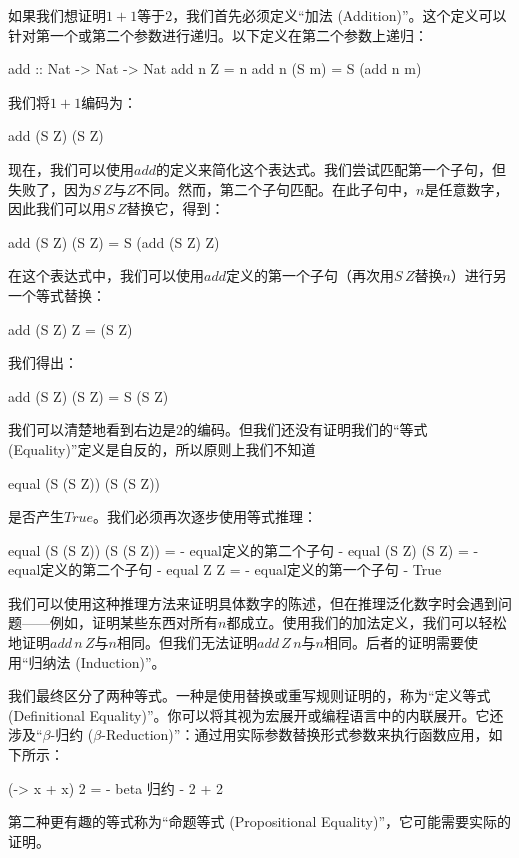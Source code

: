\documentclass[DaoFP]{subfiles}
\begin{document}
 如果我们想证明$1+1$等于$2$，我们首先必须定义“加法 (Addition)”。这个定义可以针对第一个或第二个参数进行递归。以下定义在第二个参数上递归：
 \begin{haskell}
  add :: Nat -> Nat -> Nat
  add n Z = n
  add n (S m) = S (add n m)
 \end{haskell}
 我们将$1 + 1$编码为：
 \begin{haskell}
  add (S Z) (S Z)
 \end{haskell}
 现在，我们可以使用$add$的定义来简化这个表达式。我们尝试匹配第一个子句，但失败了，因为$S\,Z$与$Z$不同。然而，第二个子句匹配。在此子句中，$n$是任意数字，因此我们可以用$S\,Z$替换它，得到：
 \begin{haskell}
  add (S Z) (S Z) = S (add (S Z) Z)
 \end{haskell}
 在这个表达式中，我们可以使用$add$定义的第一个子句（再次用$S\,Z$替换$n$）进行另一个等式替换：
 \begin{haskell}
  add (S Z) Z = (S Z)
 \end{haskell}
 我们得出：
 \begin{haskell}
  add (S Z) (S Z) = S (S Z)
 \end{haskell}
 我们可以清楚地看到右边是$2$的编码。但我们还没有证明我们的“等式 (Equality)”定义是自反的，所以原则上我们不知道
 \begin{haskell}
  equal (S (S Z)) (S (S Z))
 \end{haskell}
 是否产生$True$。我们必须再次逐步使用等式推理：
 \begin{haskell}
  equal (S (S Z)) (S (S Z)) =
   {- equal定义的第二个子句 -}
  equal (S Z) (S Z) =
   {- equal定义的第二个子句 -}
  equal Z Z =
   {- equal定义的第一个子句 -}
  True
 \end{haskell}

 我们可以使用这种推理方法来证明具体数字的陈述，但在推理泛化数字时会遇到问题——例如，证明某些东西对所有$n$都成立。使用我们的加法定义，我们可以轻松地证明$add\,n\,Z$与$n$相同。但我们无法证明$add\,Z\,n$与$n$相同。后者的证明需要使用“归纳法 (Induction)”。

 我们最终区分了两种等式。一种是使用替换或重写规则证明的，称为“定义等式 (Definitional Equality)”。你可以将其视为宏展开或编程语言中的内联展开。它还涉及“$\beta$-归约 ($\beta$-Reduction)”：通过用实际参数替换形式参数来执行函数应用，如下所示：
 \begin{haskell}
 (\x -> x + x) 2 =
  {- beta 归约 -}
 2 + 2
 \end{haskell}

 第二种更有趣的等式称为“命题等式 (Propositional Equality)”，它可能需要实际的证明。
\end{document}
